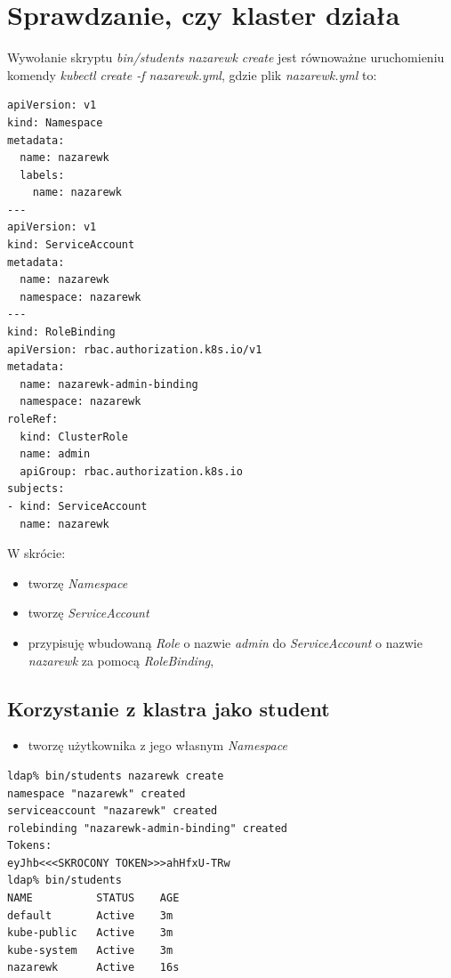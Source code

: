 \documentclass[a4paper,12pt,twoside,openany]{report}
\providecommand{\tightlist}{%
  \setlength{\itemsep}{0pt}\setlength{\parskip}{0pt}}
\begin{document}
\hypertarget{sprawdzanie-czy-klaster-dziaux142a}{%
\section{Sprawdzanie, czy klaster
działa}\label{sprawdzanie-czy-klaster-dziaux142a}}

Wywołanie skryptu \emph{bin/students nazarewk create} jest równoważne
uruchomieniu komendy \emph{kubectl create -f nazarewk.yml}, gdzie plik
\emph{nazarewk.yml} to:

\begin{lstlisting}
apiVersion: v1
kind: Namespace
metadata:
  name: nazarewk
  labels:
    name: nazarewk
---
apiVersion: v1
kind: ServiceAccount
metadata:
  name: nazarewk
  namespace: nazarewk
---
kind: RoleBinding
apiVersion: rbac.authorization.k8s.io/v1
metadata:
  name: nazarewk-admin-binding
  namespace: nazarewk
roleRef:
  kind: ClusterRole
  name: admin
  apiGroup: rbac.authorization.k8s.io
subjects:
- kind: ServiceAccount
  name: nazarewk
\end{lstlisting}

W skrócie:

\begin{itemize}
\tightlist
\item
  tworzę \emph{Namespace}
\item
  tworzę \emph{ServiceAccount}
\item
  przypisuję wbudowaną \emph{Role} o nazwie \emph{admin} do
  \emph{ServiceAccount} o nazwie \emph{nazarewk} za pomocą
  \emph{RoleBinding},
\end{itemize}

\hypertarget{korzystanie-z-klastra-jako-student}{%
\subsection{Korzystanie z klastra jako
student}\label{korzystanie-z-klastra-jako-student}}

\begin{itemize}
\tightlist
\item
  tworzę użytkownika z jego własnym \emph{Namespace}
\end{itemize}

\begin{lstlisting}
ldap% bin/students nazarewk create
namespace "nazarewk" created
serviceaccount "nazarewk" created
rolebinding "nazarewk-admin-binding" created
Tokens:
eyJhb<<<SKROCONY TOKEN>>>ahHfxU-TRw
ldap% bin/students
NAME          STATUS    AGE
default       Active    3m
kube-public   Active    3m
kube-system   Active    3m
nazarewk      Active    16s
\end{lstlisting}
\end{document}
